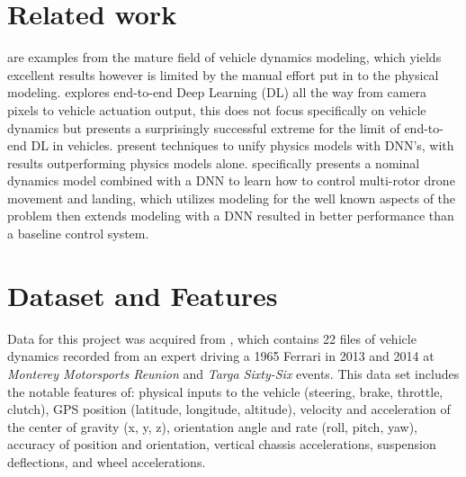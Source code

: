 \documentclass{article}
\begin{document}
\section{Related work}

\cite{guiggiani2014science, jazar2017vehicle, popp2010ground, schramm2014vehicle} are examples from the mature field of vehicle dynamics modeling, which yields excellent results however is limited by the manual effort put in to the physical modeling. \cite{bojarski2016end} explores end-to-end Deep Learning (DL) all the way from camera pixels to vehicle actuation output, this does not focus specifically on vehicle dynamics but presents a surprisingly successful extreme for the limit of end-to-end DL in vehicles. \cite{shi2018neural, zeng2019tossingbot} present techniques to unify physics models with DNN's, with results outperforming physics models alone. \cite{shi2018neural} specifically presents a nominal dynamics model combined with a DNN to learn how to control multi-rotor drone movement and landing, which utilizes modeling for the well known aspects of the problem then extends modeling with a DNN resulted in better performance than a baseline control system.

\section{Dataset and Features}

Data for this project was acquired from \cite{revs_vehicle_dynamics_database}, which contains 22 files of vehicle dynamics recorded from an expert driving a 1965 Ferrari in 2013 and 2014 at \textit{Monterey Motorsports Reunion} and \textit{Targa Sixty-Six} events. This data set includes the notable features of: physical inputs to the vehicle (steering, brake, throttle, clutch), GPS position (latitude, longitude, altitude), velocity and acceleration of the center of gravity (x, y, z), orientation angle and rate (roll, pitch, yaw), accuracy of position and orientation, vertical chassis accelerations, suspension deflections, and wheel accelerations.
\end{document}
